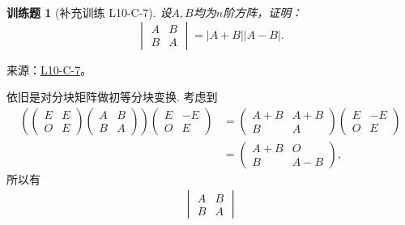\documentclass[UTF8,12pt,a4paper,fontset=fandol]{ctexart}
\newtheorem{exercise}{训练题}[section]
\begin{document}
\begin{exercise}[补充训练 L10-C-7]\label{prob:L10-C-7}
设$A,B$均为$n$阶方阵，证明：
        \[\begin{vmatrix}
                A & B \\ B & A
            \end{vmatrix} = |A+B||A-B|.\]
\end{exercise}
\noindent 来源：\href{https://github.com/yhwu-is/Linear-Algebra-Left-Undone/blob/new/%E8%AE%B2%E4%B9%89/%E4%B8%93%E9%A2%98/10%20%E8%A1%8C%E5%88%97%E5%BC%8F.tex}{L10-C-7}。
\begin{solve}
依旧是对分块矩阵做初等分块变换. 考虑到
            \begin{align*}
                \left(\begin{pmatrix}
                            E & E \\
                            O & E
                        \end{pmatrix}
                \begin{pmatrix}
                    A & B \\
                    B & A
                \end{pmatrix} \right)
                \begin{pmatrix}
                    E & -E \\
                    O & E
                \end{pmatrix}
                & = \begin{pmatrix}
                        A+B & A+B \\
                        B   & A
                    \end{pmatrix}
                \begin{pmatrix}
                    E & -E \\
                    O & E
                \end{pmatrix}      \\
                & = \begin{pmatrix}
                        A+B & O   \\
                        B   & A-B
                    \end{pmatrix},
            \end{align*}
            所以有 \begin{align*}
                \begin{vmatrix}
                    A & B \\
                    B & A
                \end{vmatrix}

\end{align*}
\end{solve}
\end{document}
